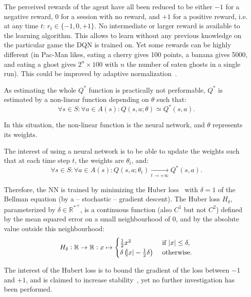 \documentclass[letterpaper]{article}
\begin{document}
The perceived rewards of the agent have all been reduced to be either $-1$ for a negative reward, $0$ for a session with no reward, and $+1$
for a positive reward, i.e. at any time $t$: $r_t \in \{-1, 0, +1\}$. No intermediate or larger reward is available to the learning algorithm.
This allows to learn without any previous knowledge on the particular game the DQN is trained on. Yet some rewards can be highly different (in Pac-Man likes,
eating a cherry gives 100 points, a banana gives 5000, and eating a ghost gives $2^n \times 100$ with $n$ the number of eaten ghosts in a single run).
This could be improved by adaptive normalization~\citep{van2016learning}.

As estimating the whole $Q^*$ function is practically not performable, $Q^*$ is estimated by a non-linear function depending on $\theta$ such that:
\begin{equation}
	\forall s \in S : \forall a \in A(s) : Q(s, a; \theta) \simeq Q^*(s, a).
\end{equation}

In this situation, the non-linear function is the neural network, and $\theta$ represents its weights.

The interest of using a neural network is to be able to update the weights such that at each time step $t$, the weights are $\theta_t$, and:
\begin{equation}
	\forall s \in S : \forall a \in A(s) : Q(s, a; \theta_t) \xrightarrow[t \to +\infty]{} Q^*(s, a).
\end{equation}

Therefore, the NN is trained by minimizing the Huber loss~\citep{huber1964robust} with $\delta=1$ of the Bellman equation (by a -- stochastic -- gradient descent).
The Huber loss $H_\delta$, parameterized by $\delta \in {\mathbb R^*}^+$, is a continuous function (also $C^1$ but not $C^2$) defined by the mean
squared error on a small neighbourhood of $0$, and by the absolute value outside this neighbourhood:
\begin{equation}
	H_\delta : \mathbb R \to \mathbb R : x \mapsto \begin{cases}\frac 12x^2                                &\text{ if } \abs x \leq \delta,\\
	                                                            \delta\left(\abs x - \frac 12\delta\right) &\text{ otherwise.}\end{cases}
\end{equation}

The interest of the Hubert loss is to bound the gradient of the loss between $-1$ and $+1$, and is claimed to increase stability~\citep{mnih2015human},
yet no further investigation has been performed.
\end{document}
